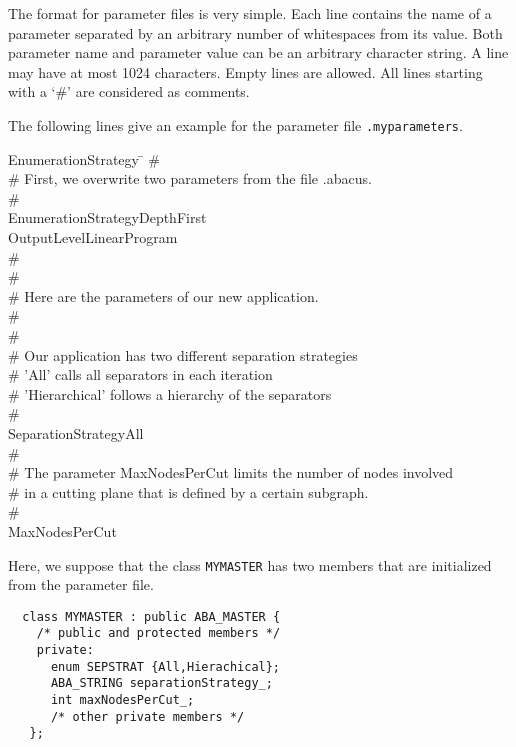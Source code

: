 The format for parameter files is very simple. Each line
contains the name of a parameter separated by an arbitrary number
of whitespaces from its value. Both parameter name and parameter value
can be an arbitrary character string. A line may have at most 1024
characters. Empty lines are allowed. All lines starting with a
`\#' are considered as comments.

The following lines give an example for the parameter file
{\tt .myparameters}.

{\ttfamily
\begin{tabbing}
EnumerationStrategy   \=                 \kill
\#\\
\# First, we overwrite two parameters from the file .abacus.\\
\#\\
EnumerationStrategy\>DepthFirst\\
OutputLevel\>LinearProgram\\
\#\\
\#\\
\# Here are the parameters of our new application.\\
\#\\
\#\\
\# Our application has two different separation strategies\\
\# 'All' calls all separators in each iteration\\
\# 'Hierarchical' follows a hierarchy of the separators\\
\#\\
SeparationStrategy\>All\\
\#\\
\# The parameter MaxNodesPerCut limits the number of nodes involved\\
\# in a cutting plane that is defined by a certain subgraph.\\
\#\\  
MaxNodesPerCut\\
\end{tabbing}
}

\bigskip\noindent
Here, we suppose that the class {\tt MYMASTER}
has two members that are initialized from the parameter file.

\begin{verbatim}
  class MYMASTER : public ABA_MASTER {
    /* public and protected members */
    private:
      enum SEPSTRAT {All,Hierachical};
      ABA_STRING separationStrategy_;
      int maxNodesPerCut_;
      /* other private members */
   };
\end{verbatim}

